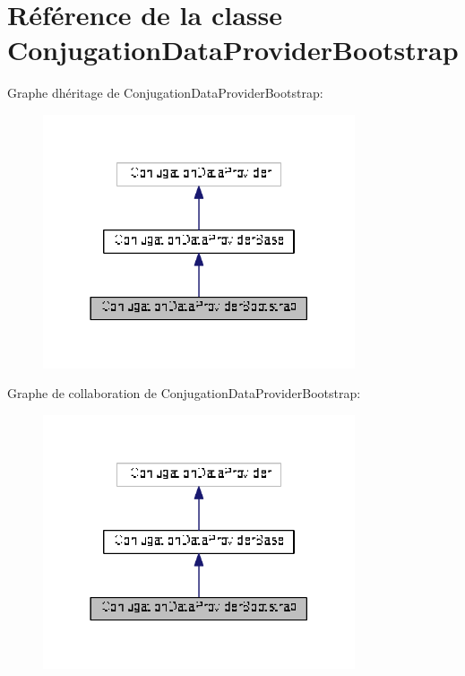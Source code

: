 \hypertarget{class_conjugation_data_provider_bootstrap}{}\section{Référence de la classe Conjugation\+Data\+Provider\+Bootstrap}
\label{class_conjugation_data_provider_bootstrap}


Graphe d\textquotesingle{}héritage de Conjugation\+Data\+Provider\+Bootstrap\+:
\nopagebreak
\begin{figure}[H]
\begin{center}
\leavevmode
\includegraphics[width=261pt]{class_conjugation_data_provider_bootstrap__inherit__graph}
\end{center}
\end{figure}


Graphe de collaboration de Conjugation\+Data\+Provider\+Bootstrap\+:
\nopagebreak
\begin{figure}[H]
\begin{center}
\leavevmode
\includegraphics[width=261pt]{class_conjugation_data_provider_bootstrap__coll__graph}
\end{center}
\end{figure}
